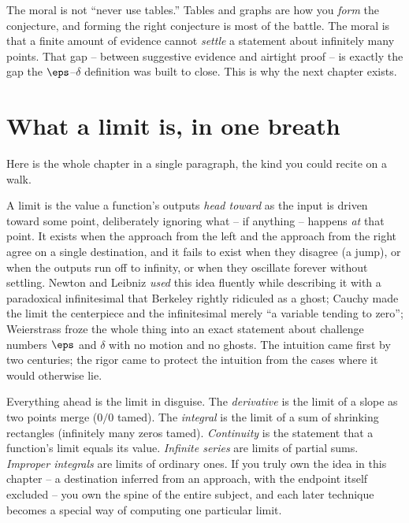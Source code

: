 \begin{focusbox}
The moral is not ``never use tables.'' Tables and graphs are how you \emph{form} the conjecture,
and forming the right conjecture is most of the battle. The moral is that a finite amount of
evidence cannot \emph{settle} a statement about infinitely many points. That gap -- between
suggestive evidence and airtight proof -- is exactly the gap the $\eps$--$\delta$ definition was
built to close. This is why the next chapter exists.
\end{focusbox}

\section{What a limit is, in one breath}

Here is the whole chapter in a single paragraph, the kind you could recite on a walk.

A limit is the value a function's outputs \emph{head toward} as the input is driven toward some
point, deliberately ignoring what -- if anything -- happens \emph{at} that point. It exists when
the approach from the left and the approach from the right agree on a single destination, and it
fails to exist when they disagree (a jump), or when the outputs run off to infinity, or when they
oscillate forever without settling. Newton and Leibniz \emph{used} this idea fluently while
describing it with a paradoxical infinitesimal that Berkeley rightly ridiculed as a ghost; Cauchy
made the limit the centerpiece and the infinitesimal merely ``a variable tending to zero'';
Weierstrass froze the whole thing into an exact statement about challenge numbers $\eps$ and
$\delta$ with no motion and no ghosts. The intuition came first by two centuries; the rigor came
to protect the intuition from the cases where it would otherwise lie.

\begin{connectionbox}
Everything ahead is the limit in disguise. The \emph{derivative} is the limit of a slope as two
points merge ($0/0$ tamed). The \emph{integral} is the limit of a sum of shrinking rectangles
(infinitely many zeros tamed). \emph{Continuity} is the statement that a function's limit equals
its value. \emph{Infinite series} are limits of partial sums. \emph{Improper integrals} are
limits of ordinary ones. If you truly own the idea in this chapter -- a destination inferred from
an approach, with the endpoint itself excluded -- you own the spine of the entire subject, and
each later technique becomes a special way of computing one particular limit.
\end{connectionbox}

